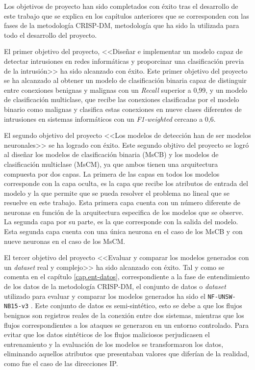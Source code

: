 Los objetivos de proyecto han sido completados con éxito tras el desarrollo de este trabajo que se explica en los capítulos anteriores que se corresponden con las fases de la metodología CRISP-DM, metodología que ha sido la utilizada para todo el desarrollo del proyecto.

El primer objetivo del proyecto, <<Diseñar e implementar un modelo capaz de detectar intrusiones en redes informáticas y proporcinar una clasificación previa de la intrusión>> ha sido alcanzado con éxito. Este primer objetivo del proyecto se ha alcanzado al obtener un modelo de clasificación binaria capaz de distinguir entre conexiones benignas y malignas con un \textit{Recall} superior a 0,99, y un modelo de clasificación multiclase, que recibe las conexiones clasificadas por el modelo binario como malignas y clasifica estas conexiones en nueve clases diferentes de intrusiones en sistemas informáticos con un \textit{F1-weighted} cercano a 0,6.

El segundo objetivo del proyecto <<Los modelos de detección han de ser modelos neuronales>> se ha logrado con éxito. Este segundo objtivo del proyecto se logró al diseñar los modelos de clasificación binaria (MsCB) y los modelos de clasificación multiclase (MsCM), ya que ambos tienen una arquitectura compuesta por dos capas. La primera de las capas en todos los modelos corresponde con la capa oculta, es la capa que recibe los atributos de entrada del modelo y la que permite que se pueda resolver el problema no lineal que se resuelve en este trabajo. Esta primera capa cuenta con un número diferente de neuronas en función de la arquitectura especifica de los modelos que se observe. La segunda capa por su parte, es la que corresponde con la salida del modelo. Esta segunda capa cuenta con una única neurona en el caso de los MsCB y con nueve neuronas en el caso de los MsCM.

El tercer objetivo del proyecto <<Evaluar y comparar los modelos generados con un \textit{dataset} real y complejo>> ha sido alcanzado con éxito. Tal y como se comenta en el capítulo \ref{cap.ent-datos}, correspondiente a la fase de entendimiento de los datos de la metodología CRISP-DM, el conjunto de datos o \textit{dataset} utilizado para evaluar y comparar los modelos generados ha sido el \texttt{NF-UNSW-NB15-v3} \cite{luay2025NetFlowDatasetsV3}. Este conjunto de datos es semi-sintético, esto se debe a que los flujos benignos son registros reales de la conexión entre dos sistemas, mientras que los flujos correspondientes a los ataques se generaron en un entorno controlado. Para evitar que los datos sintéticos de los flujos maliciosos perjudicasen el entrenamiento y la evaluación de los modelos se transformaron los datos, eliminando aquellos atributos que presentaban valores que diferían de la realidad, como fue el caso de las direcciones IP.

